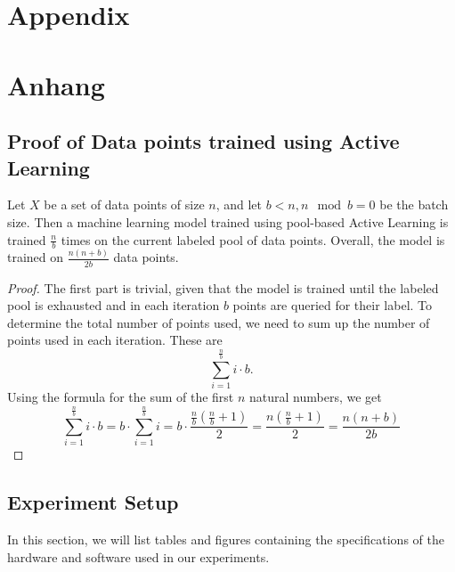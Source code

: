 
{\chapter{Appendix}}    %
{\chapter{Anhang}}      %
\label{chap:appendix}


\section{Proof of Data points trained using Active Learning}
\label{sec:appendix:FirstSection}
\begin{theorem}
Let $X$ be a set of data points of size $n$, and let $b < n, n \mod b = 0$ be the batch size. Then a machine learning model trained
using pool-based Active Learning is trained $\frac{n}{b}$ times on the current labeled pool of data points. Overall, the model
is trained on $\frac{n(n+b)}{2b}$ data points.
\end{theorem}
\begin{proof}
    The first part is trivial, given that the model is trained until the labeled pool is exhausted and in each iteration $b$
    points are queried for their label. To determine the total number of points used, we need to sum up the number of points
    used in each iteration. These are
    \begin{equation}
        \sum_{i=1}^{\frac{n}{b}} i \cdot b.
    \end{equation}
    Using the formula for the sum of the first $n$ natural numbers, we get
    \begin{equation}
        \sum_{i=1}^{\frac{n}{b}} i \cdot b = b \cdot \sum_{i=1}^{\frac{n}{b}} i = b \cdot \frac{\frac{n}{b} (\frac{n}{b} + 1)}{2}
        = \frac{n (\frac{n}{b} + 1)}{2} = \frac{n(n+b)}{2b}
    \end{equation}
\end{proof}

\section{Experiment Setup}
\label{sec:Appendix:Setup}
In this section, we will list tables and figures containing the specifications of the hardware and software used in our experiments.

